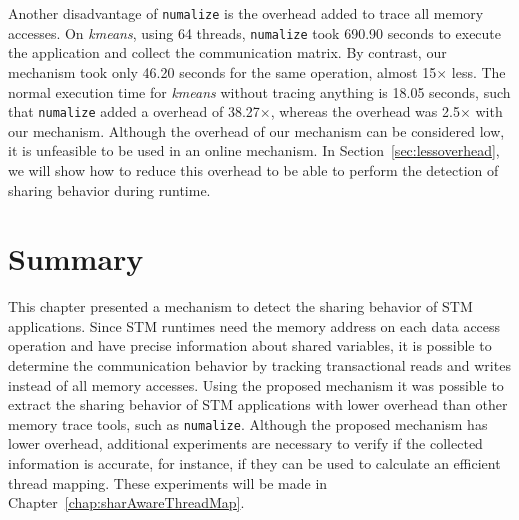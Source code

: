 Another disadvantage of \texttt{numalize} is the overhead added to trace all memory accesses. On \emph{kmeans}, using 64 threads, \texttt{numalize} took 690.90 seconds to execute the application and collect the communication matrix. By contrast, our mechanism took only 46.20 seconds for the same operation, almost 15$\times$ less. The normal execution time for \emph{kmeans} without tracing anything is 18.05 seconds, such that \texttt{numalize} added a overhead of 38.27$\times$, whereas the overhead was 2.5$\times$ with our mechanism. Although the overhead of our mechanism can be considered low, it is unfeasible to be used in an online mechanism. In Section~\ref{sec:lessoverhead}, we will show how to reduce this overhead to be able to perform the detection of sharing behavior during runtime.


\section{Summary}

This chapter presented a mechanism to detect the sharing behavior of STM applications. Since STM runtimes need the memory address on each data access operation and have precise information about shared variables, it is possible to determine the communication behavior by tracking transactional reads and writes instead of all memory accesses. Using the proposed mechanism it was possible to extract the sharing behavior of STM applications with lower overhead than other memory trace tools, such as \texttt{numalize}. Although the proposed mechanism has lower overhead, additional experiments are necessary to verify if the collected information is accurate, for instance, if they can be used to calculate an efficient thread mapping. These experiments will be made in Chapter~\ref{chap:sharAwareThreadMap}.
